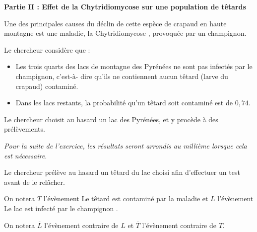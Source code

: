 \begin{center}\textbf{Partie II : Effet de la Chytridiomycose sur une population de têtards}\end{center}

Une des principales causes du déclin de cette espèce de crapaud en haute montagne est une maladie, la \og Chytridiomycose \fg, provoquée par un champignon.

Le chercheur considère que :

\begin{itemize}
	\item Les trois quarts des lacs de montagne des Pyrénées ne sont pas infectés par le champignon, c'est-à- dire qu'ils ne contiennent aucun têtard (larve du crapaud) contaminé.
	\item Dans les lacs restants, la probabilité qu'un têtard soit contaminé est de $0,74$.
\end{itemize}

Le chercheur choisit au hasard un lac des Pyrénées, et y procède à des prélèvements.

\emph{Pour la suite de l'exercice, les résultats seront arrondis au millième lorsque cela est nécessaire.}

Le chercheur prélève au hasard un têtard du lac choisi afin d'effectuer un test avant de le relâcher.

On notera $T$ l'évènement \og Le têtard est contaminé par la maladie\fg{} et $L$ l'évènement \og Le lac est infecté par le champignon \fg.

On notera $\overline{L}$ l'évènement contraire de $L$ et $\overline{T}$ l'évènement contraire de $T$.

